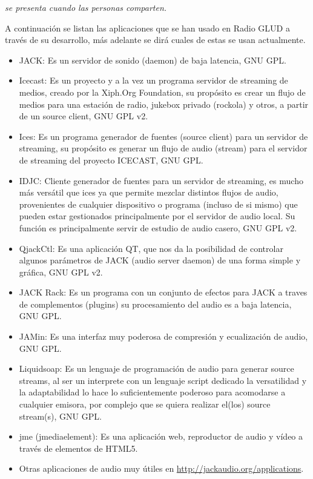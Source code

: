 \begin{multicols}{2}
\begin{entradilla} %
{\em {\color{introcolor}{Poder Social}} se presenta cuando las personas comparten.}
\end{entradilla}


A continuación se listan las aplicaciones que se han usado en Radio GLUD a través de su desarrollo, más adelante se dirá cuales de estas se usan actualmente.

\begin{itemize}
\item JACK: Es un servidor de sonido (daemon) de baja latencia, GNU GPL.
\item Icecast: Es un proyecto y a la vez un programa servidor de streaming de medios, creado por la Xiph.Org Foundation, su propósito es crear un flujo de medios para una estación de radio, jukebox privado (rockola) y otros, a partir de un source client, GNU GPL v2.
\item Ices: Es un programa generador de fuentes (source client) para un servidor de streaming, su propósito es generar un flujo de audio (stream) para el servidor de streaming del proyecto ICECAST, GNU GPL.
\item IDJC: Cliente generador de fuentes para un servidor de streaming, es mucho más versátil que ices ya que permite mezclar distintos flujos de audio, provenientes de cualquier dispositivo o programa (incluso de si mismo) que pueden estar gestionados principalmente por el servidor de audio local. Su función es principalmente servir de estudio de audio casero, GNU GPL v2.
\item QjackCtl: Es una aplicación QT, que nos da la posibilidad de controlar algunos parámetros de JACK (audio server daemon) de una forma simple y gráfica, GNU GPL v2.
\item JACK Rack: Es un programa con un conjunto de efectos para JACK a traves de complementos (plugins) su procesamiento del audio es a baja latencia, GNU GPL.
\item JAMin: Es una interfaz muy poderosa de compresión y ecualización de audio, GNU GPL.
\item Liquidsoap:  Es un lenguaje de programación de audio para generar source streams, al ser un interprete con un lenguaje script dedicado la versatilidad y la adaptabilidad lo hace lo suficientemente poderoso para acomodarse a cualquier emisora, por complejo que se quiera realizar el(los) source stream(s), GNU GPL.
\item jme (jmediaelement): Es una aplicación web, reproductor de audio y vídeo a través de elementos de HTML5.
\item Otras aplicaciones de audio muy útiles en  \url{http://jackaudio.org/applications}.
\end{itemize}


\end{multicols}
